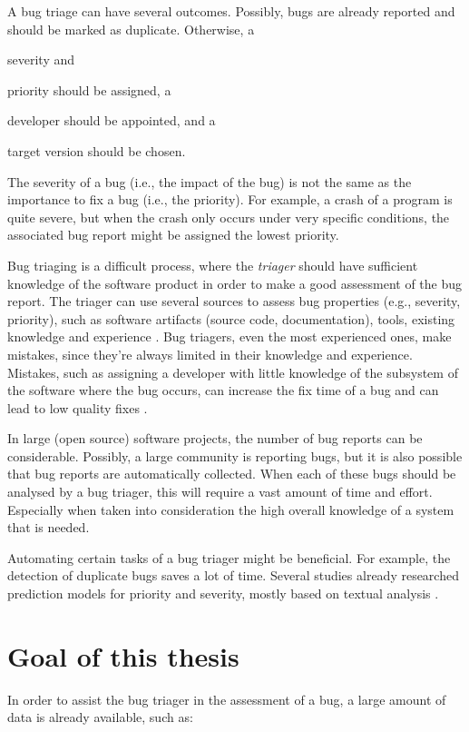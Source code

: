 A bug triage can have several outcomes. Possibly, bugs are already reported and should be marked as duplicate. Otherwise, a 
\begin{inparaenum}[(1)]
\item severity and
\item priority should be assigned, a 
\item developer should be appointed, and a
\item target version should be chosen.
\end{inparaenum}
The severity of a bug (i.e., the impact of the bug) is not the same as the importance to fix a bug (i.e., the priority). For example, a crash of a program is quite severe, but when the crash only occurs under very specific conditions, the associated bug report might be assigned the lowest priority.

Bug triaging is a difficult process, where the \emph{triager} should have sufficient knowledge of the software product in order to make a good assessment of the bug report. The triager can use several sources to assess bug properties (e.g., severity, priority), such as software artifacts (source code, documentation), tools, existing knowledge and experience \cite{Panichella2012}. Bug triagers, even the most experienced ones, make mistakes, since they're always limited in their knowledge and experience. Mistakes, such as assigning a developer with little knowledge of the subsystem of the software where the bug occurs, can increase the fix time of a bug and can lead to low quality fixes \cite{Zimmermann2010,Bettenburg2007}.

In large (open source) software projects, the number of bug reports can be considerable. Possibly, a large community is reporting bugs, but it is also possible that bug reports are automatically collected. When each of these bugs should be analysed by a bug triager, this will require a vast amount of time and effort. Especially when taken into consideration the high overall knowledge of a system that is needed.

Automating certain tasks of a bug triager might be beneficial. For example, the detection of duplicate bugs saves a lot of time. Several studies already researched prediction models for priority and severity, mostly based on textual analysis \cite{Sun2011,Lamkanfi2010,Panichella2012}.

\section{Goal of this thesis} %
In order to assist the bug triager in the assessment of a bug, a large amount of data is already available, such as:

